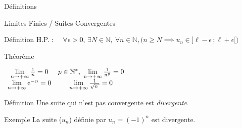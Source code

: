 \documentclass{cours}
\begin{document}
\begin{Gpartie}{Définitions}
\begin{Spartie}{Limites Finies / Suites Convergentes}
\begin{SSpartie}{Définition}
                H.P. : $\quad\forall\epsilon >0,~\exists N\in\mathbb{N},~\forall n\in\mathbb{N}, \Big(n\geq N\implies u_n\in\big]\ell-\epsilon\,; \ell+\epsilon\big[\Big)$
            \end{SSpartie}
            \begin{SSpartie}{Théorème} 
                \begin{center}$\begin{array}{cc}
                    \lim\limits_{n\to +\infty}\frac{1}{n}=0 & p\in\mathbb{N^*},\ \lim\limits_{n\to +\infty}\frac{1}{n^p}=0 \\
                    \lim\limits_{n\to +\infty}\me^{-n}=0 & \lim\limits_{n\to +\infty}\frac{1}{\sqrt{n}}=0
                \end{array}$\end{center}
            \end{SSpartie}
            \begin{SSpartie}{Définition} 
                Une suite qui n'est pas convergente est \emph{divergente}.
            \end{SSpartie}
            \begin{SSpartie}{Exemple} 
                La suite ($u_n$) définie par $u_n=(-1)^n$ est divergente.
            \end{SSpartie}
        \end{Spartie}
    \end{Gpartie}
    \pagebreak
\end{document}
